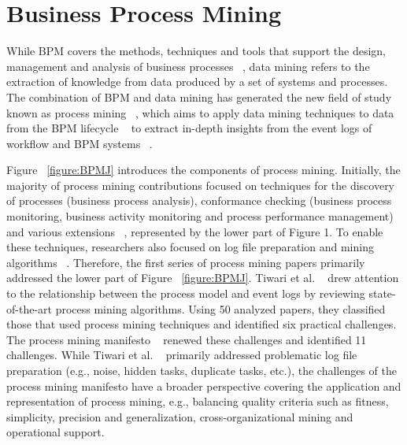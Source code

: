 


\section{Business Process Mining}

While BPM covers the methods, techniques and tools that support the design, management and analysis of business processes ~\cite{van2003workflow}, data mining refers to the extraction of knowledge from data produced by a set of systems and processes. The combination of BPM and data mining has generated the new field of study known as process mining ~\cite{van2011process}, which aims to apply data mining techniques to data from the BPM lifecycle ~\cite{song2008trace} to extract in-depth insights from the event logs of workflow and BPM systems ~\cite{van2003workflow}.



Figure ~\ref{figure:BPMJ} introduces the components of process mining. Initially, the majority of process mining contributions focused on techniques for the discovery of processes (business process analysis), conformance checking (business process monitoring, business activity monitoring and process performance management) and various extensions ~\cite{song2008trace}, represented by the lower part of Figure 1. To enable these techniques, researchers also focused on log file preparation and mining algorithms ~\cite{weijters2006process}. Therefore, the first series of process mining papers primarily addressed the lower part of Figure ~\ref{figure:BPMJ}. Tiwari et al. ~\cite{tiwari2008review} drew attention to the relationship between the process model and event logs by reviewing state-of-the-art process mining algorithms. Using 50 analyzed papers, they classified those that used process mining techniques and identified six practical challenges. The process mining manifesto ~\cite{van2012process} renewed these challenges and identified 11 challenges. While Tiwari et al. ~\cite{tiwari2008review} primarily addressed problematic log file preparation (e.g., noise, hidden tasks, duplicate tasks, etc.), the challenges of the process mining manifesto have a broader perspective covering the application and representation of process mining, e.g., balancing quality criteria such as fitness, simplicity, precision and generalization, cross-organizational mining and operational support.


